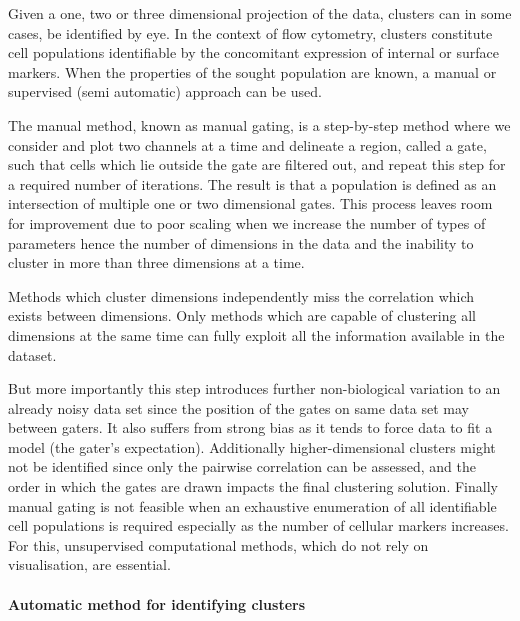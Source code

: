 Given a one, two or three dimensional projection of the data, clusters can in some cases, be identified by eye.
In the context of flow cytometry, clusters constitute cell populations identifiable by the concomitant expression of internal or surface markers.
When the properties of the sought population are known, a manual or supervised (semi automatic) approach can be used.

The manual method, known as manual gating,
is a step-by-step method where we consider and plot two channels at a time and delineate a region, called a gate, such that cells which lie outside the gate are filtered out,
and repeat this step for a required number of iterations.
The result is that a population is defined as an intersection of multiple one or two dimensional gates.
This process leaves room for improvement due to poor scaling when we increase the number of types of parameters hence the number of dimensions in the data and the inability
to cluster in more than three dimensions at a time.

Methods which cluster dimensions independently miss the correlation which exists between dimensions.
Only methods which are capable of clustering all dimensions at the same time can fully exploit all the information available in the dataset.


But more importantly this step introduces further non-biological variation to an already noisy data set \citep{Maecker:2010fg} since the position of the gates
on same data set may between gaters.
It also suffers from strong bias as it tends to force data to fit a model (the gater's expectation).
Additionally higher-dimensional clusters might not be identified since only the pairwise correlation can be assessed, and the order in which the gates are drawn impacts
the final clustering solution.
Finally manual gating is not feasible when an exhaustive enumeration of all identifiable cell populations is required \citep{Siebert:2010iv,Aghaeepour:2012fq} especially
as the number of cellular markers increases.
For this, unsupervised computational methods, which do not rely on visualisation, are essential.


\paragraph{Automatic method for identifying clusters}

